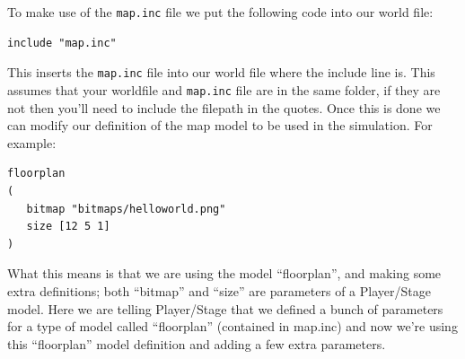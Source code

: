\documentclass[a4paper]{report}
\newcommand{\plst}{Player/Stage\xspace}
\begin{document}
To make use of the \verb|map.inc| file we put the following code into our world file:
\begin{verbatim}
include "map.inc"
\end{verbatim}
This inserts the \verb|map.inc| file into our world file where the include line is. This assumes that your worldfile and \verb|map.inc| file are in the same folder, if they are not then you'll need to include the filepath in the quotes. Once this is done we can modify our definition of the map model to be used in the simulation. For example:
\begin{verbatim}
floorplan
(
   bitmap "bitmaps/helloworld.png"
   size [12 5 1]	
)
\end{verbatim}
What this means is that we are using the model ``floorplan'', and making some extra definitions; both ``bitmap'' and ``size'' are parameters of a \plst model. Here we are telling \plst that we defined a bunch of parameters for a type of model called ``floorplan'' (contained in map.inc) and now we're using this ``floorplan'' model definition and adding a few extra parameters.
\end{document}
